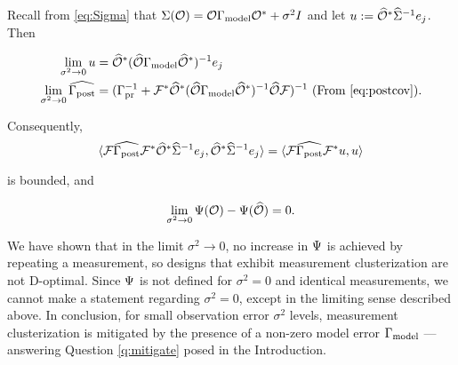 Recall from \eqref{eq:Sigma} that $\Sigma(\mathcal{O}) = \mathcal{O}
\Gamma_{\textup{model}} \mathcal{O}^* + \sigma^2I$ and let $u := \widehat{\mathcal{O}}^*
\widehat{\Sigma}^{-1}e_j$. Then

\begin{align*}
  \begin{split}
    \lim_{\sigma^2 \to 0} u &= \widehat{\mathcal{O}}^*(\widehat{\mathcal{O}} \Gamma_{\textup{model}} \widehat{\mathcal{O}}^*)^{-1}e_j\\
    \lim_{\sigma^2 \to 0} \widehat{\Gamma_{\textup{post}}} &= (\Gamma_{\textup{pr}}^{-1} + \mathcal{F}^* \widehat{\mathcal{O}}^* (\widehat{\mathcal{O}} \Gamma_{\textup{model}} \widehat{\mathcal{O}}^*)^{-1} \widehat{\mathcal{O}} \mathcal{F})^{-1} \text{ (From \eqref{eq:postcov})}.
  \end{split}
\end{align*}

Consequently, 
\begin{equation*}
   \langle \mathcal{F} \widehat{\Gamma_{\textup{post}}} \mathcal{F}^* \widehat{\mathcal{O}}^* \widehat{\Sigma}^{-1}
    e_j, \widehat{\mathcal{O}}^* \widehat{\Sigma}^{-1}e_j \rangle 
  = \langle \mathcal{F} \widehat{\Gamma_{\textup{post}}} \mathcal{F}^* u, u \rangle
\end{equation*}

is bounded, and

\begin{equation*}
\lim_{\sigma^2 \to 0} \Psi(\mathcal{O}) -\Psi(\widehat{\mathcal{O}}) = 0.
\end{equation*}

We have shown that in the limit $\sigma^2 \to 0$, no increase in
$\Psi$ is achieved by repeating a measurement, so designs that exhibit
measurement clusterization are not D-optimal. Since $\Psi$ is not
defined for $\sigma^2 = 0$ and identical measurements, we cannot make
a statement regarding $\sigma^2 = 0$, except in the limiting sense
described above. In conclusion, for small observation error $\sigma^2$
levels, measurement clusterization is mitigated by the presence of a
non-zero model error $\Gamma_{\textup{model}}$ --- answering Question \ref{q:mitigate}
posed in the Introduction.%
